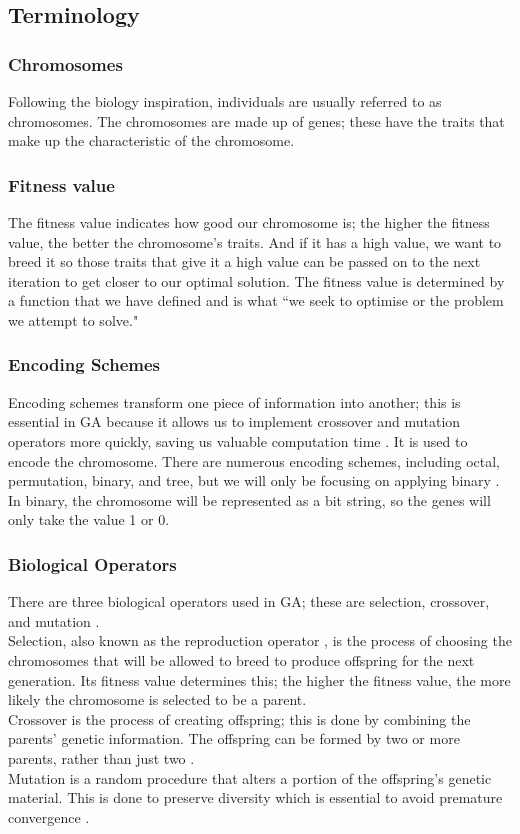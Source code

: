 \documentclass[12pt]{report}
\begin{document}
\subsection{Terminology}
\subsubsection*{Chromosomes}
Following the biology inspiration, individuals are usually referred to as chromosomes. The chromosomes are made up of genes; these have the traits that make up the characteristic of the chromosome.

\subsubsection*{Fitness value}
The fitness value indicates how good our chromosome is; the higher the fitness value, the better the chromosome's traits. And if it has a high value, we want to breed it so those traits that give it a high value can be passed on to the next iteration to get closer to our optimal solution. The fitness value is determined by a function that we have defined and is what ``we seek to optimise or the problem we attempt to solve."\cite{source4}

\subsubsection*{Encoding Schemes}
Encoding schemes transform one piece of information into another; this is essential in GA because it allows us to implement crossover and mutation operators more quickly, saving us valuable computation time \cite{source1}. It is used to encode the chromosome. There are numerous encoding schemes, including octal, permutation, binary, and tree, but we will only be focusing on applying binary \cite{source1}. In binary, the chromosome will be represented as a bit string, so the genes will only take the value 1 or 0.

\subsubsection*{Biological Operators}
There are three biological operators used in GA; these are selection, crossover, and mutation \cite{source4,source1}.\\
\noindent
Selection, also known as the reproduction operator \cite{source1}, is the process of choosing the chromosomes that will be allowed to breed to produce offspring for the next generation. Its fitness value determines this; the higher the fitness value, the more likely the chromosome is selected to be a parent.
\\ \newline \noindent
Crossover is the process of creating offspring; this is done by combining the parents' genetic information. The offspring can be formed by two or more parents, rather than just two \cite{source1}.
\\ \noindent
Mutation is a random procedure that alters a portion of the offspring's genetic material. This is done to preserve diversity which is essential to avoid premature convergence \cite{source1}.
\end{document}
